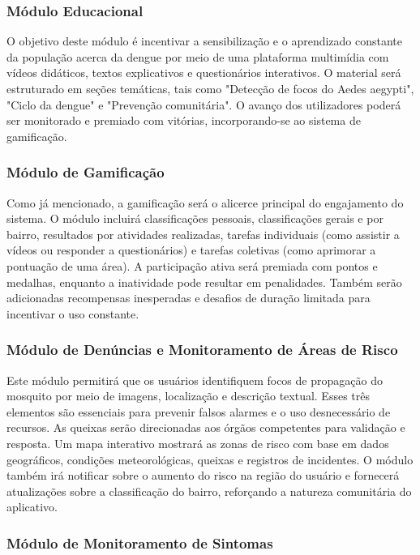 \documentclass[a5paper, 12pt]{article}
\begin{document}
\subsubsection{Módulo Educacional}

O objetivo deste módulo é incentivar a sensibilização e o aprendizado constante da população acerca da dengue por meio de uma plataforma multimídia com vídeos didáticos, textos explicativos e questionários interativos.  O material será estruturado em seções temáticas, tais como "Detecção de focos do Aedes aegypti", "Ciclo da dengue" e "Prevenção comunitária".  O avanço dos utilizadores poderá ser monitorado e premiado com vitórias, incorporando-se ao sistema de gamificação.

\subsubsection{Módulo de Gamificação}

Como já mencionado, a gamificação será o alicerce principal do engajamento do sistema.  O módulo incluirá classificações pessoais, classificações gerais e por bairro, resultados por atividades realizadas, tarefas individuais (como assistir a vídeos ou responder a questionários) e tarefas coletivas (como aprimorar a pontuação de uma área).  A participação ativa será premiada com pontos e medalhas, enquanto a inatividade pode resultar em penalidades.  Também serão adicionadas recompensas inesperadas e desafios de duração limitada para incentivar o uso constante.

\subsubsection{Módulo de Denúncias e Monitoramento de Áreas de Risco}

Este módulo permitirá que os usuários identifiquem focos de propagação do mosquito por meio de imagens, localização e descrição textual. Esses três elementos são essenciais para prevenir falsos alarmes e o uso desnecessário de recursos.   As queixas serão direcionadas aos órgãos competentes para validação e resposta.   Um mapa interativo mostrará as zonas de risco com base em dados geográficos, condições meteorológicas, queixas e registros de incidentes.   O módulo também irá notificar sobre o aumento do risco na região do usuário e fornecerá atualizações sobre a classificação do bairro, reforçando a natureza comunitária do aplicativo.

\subsubsection{Módulo de Monitoramento de Sintomas}
\end{document}
